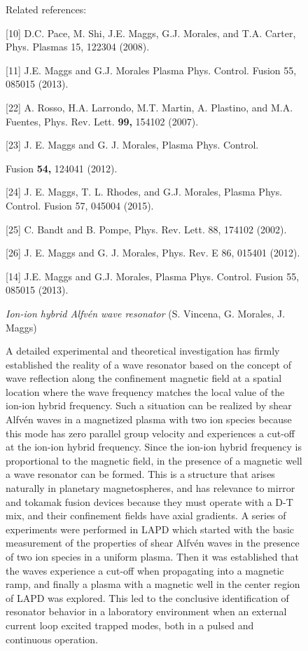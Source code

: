 \documentclass[11pt]{article}
\begin{document}
\begin{description}
\begin{figure}[!htbp]
Related references:

{[}10{]} D.C. Pace, M. Shi, J.E. Maggs, G.J. Morales, and T.A. Carter,
Phys. Plasmas 15, 122304 (2008).

{[}11{]} J.E. Maggs and G.J. Morales Plasma Phys. Control. Fusion 55,
085015 (2013).

{[}22{]} A. Rosso, H.A. Larrondo, M.T. Martin, A. Plastino, and M.A.
Fuentes, Phys. Rev. Lett. \textbf{99,} 154102 (2007).

{[}23{]} J. E. Maggs and G. J. Morales, Plasma Phys. Control.

Fusion \textbf{54,} 124041 (2012).

{[}24{]} J. E. Maggs, T. L. Rhodes, and G.J. Morales, Plasma Phys.
Control. Fusion 57, 045004 (2015).

{[}25{]} C. Bandt and B. Pompe, Phys. Rev. Lett. 88, 174102 (2002).

{[}26{]} J. E. Maggs and G. J. Morales, Phys. Rev. E 86, 015401 (2012).

{[}14{]} J.E. Maggs and G.J. Morales, Plasma Phys. Control. Fusion 55,
085015 (2013).

\emph{Ion-ion hybrid Alfvén wave resonator} (S. Vincena, G. Morales, J.
Maggs)

A detailed experimental and theoretical investigation has firmly
established the reality of a wave resonator based on the concept of wave
reflection along the confinement magnetic field at a spatial location
where the wave frequency matches the local value of the ion-ion hybrid
frequency. Such a situation can be realized by shear Alfvén waves in a
magnetized plasma with two ion species because this mode has zero
parallel group velocity and experiences a cut-off at the ion-ion hybrid
frequency. Since the ion-ion hybrid frequency is proportional to the
magnetic field, in the presence of a magnetic well a wave resonator can
be formed. This is a structure that arises naturally in planetary
magnetospheres, and has relevance to mirror and tokamak fusion devices
because they must operate with a D-T mix, and their confinement fields
have axial gradients. A series of experiments were performed in LAPD
which started with the basic measurement of the properties of shear
Alfvén waves in the presence of two ion species in a uniform plasma.
Then it was established that the waves experience a cut-off when
propagating into a magnetic ramp, and finally a plasma with a magnetic
well in the center region of LAPD was explored. This led to the
conclusive identification of resonator behavior in a laboratory
environment when an external current loop excited trapped modes, both in
a pulsed and continuous operation.


\end{figure}
\end{description}
\end{document}
